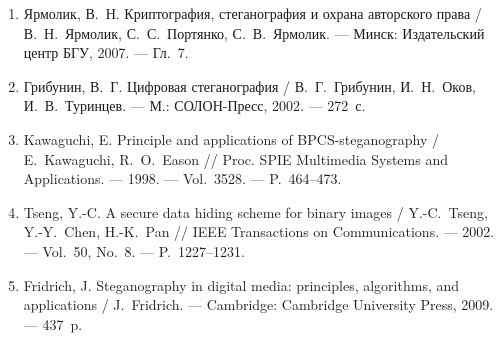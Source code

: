 \documentclass[14pt,a4paper]{extarticle}
\begin{document}

\begin{enumerate}
\item Ярмолик, В.~Н. Криптография, стеганография и охрана авторского права /
В.~Н.~Ярмолик, С.~С.~Портянко, С.~В.~Ярмолик. --- Минск: Издательский центр БГУ,
2007. --- Гл.~7.
\item Грибунин, В.~Г. Цифровая стеганография / В.~Г.~Грибунин, И.~Н.~Оков,
И.~В.~Туринцев. --- М.: СОЛОН-Пресс, 2002. --- 272~с.
\item Kawaguchi, E. Principle and applications of BPCS-steganography / E.~Kawaguchi,
R.~O.~Eason // Proc. SPIE Multimedia Systems and Applications. --- 1998. ---
Vol.~3528. --- P.~464--473.
\item Tseng, Y.-C. A secure data hiding scheme for binary images / Y.-C.~Tseng,
Y.-Y.~Chen, H.-K.~Pan // IEEE Transactions on Communications. --- 2002. --- Vol.~50,
No.~8. --- P.~1227--1231.
\item Fridrich, J. Steganography in digital media: principles, algorithms, and
applications / J.~Fridrich. --- Cambridge: Cambridge University Press, 2009. ---
437~p.
\end{enumerate}
\end{document}
